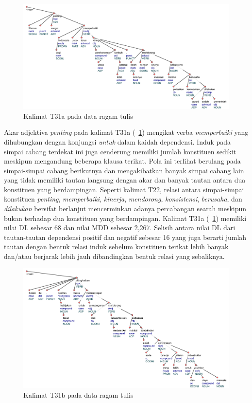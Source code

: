 \begin{figure}
	\centering \includegraphics[width=1
	\textwidth] {pics/ts2079.jpg} 
	\caption{Kalimat T31a pada data ragam tulis} 
	\label{fig:ts2079} 
\end{figure}

Akar adjektiva \textit{penting} pada kalimat T31a (\pic~\ref{fig:ts2079}) mengikat verba \textit{memperbaiki} yang dihubungkan dengan konjungsi \textit{untuk} dalam kaidah dependensi. Induk pada simpai cabang terdekat ini juga cenderung memiliki jumlah konstituen sedikit meskipun mengandung beberapa klausa terikat. Pola ini terlihat berulang pada simpai-simpai cabang berikutnya dan mengakibatkan banyak simpai cabang lain yang tidak memiliki tautan langsung dengan akar dan banyak tautan antara dua konstituen yang berdampingan. Seperti kalimat T22, relasi antara simpai-simpai konstituen \textit{penting}, \textit{memperbaiki}, \textit{kinerja}, \textit{mendorong}, \textit{konsistensi}, \textit{berusaha}, dan \textit{dilakukan} bersifat berlanjut mencerminkan adanya percabangan searah meskipun bukan terhadap dua konstituen yang berdampingan. Kalimat T31a (\pic~\ref{fig:ts2079}) memiliki nilai DL sebesar 68 dan nilai MDD sebesar 2,267. Selisih antara nilai DL dari tautan-tautan dependensi positif dan negatif sebesar 16 yang juga berarti jumlah tautan dengan bentuk relasi induk sebelum konstituen terikat lebih banyak dan/atau berjarak lebih jauh dibandingkan bentuk relasi yang sebaliknya.

\begin{figure}
	\centering \includegraphics[width=1
	\textwidth] {pics/ts2081.jpg} 
	\caption{Kalimat T31b pada data ragam tulis} 
	\label{fig:ts2081} 
\end{figure}

